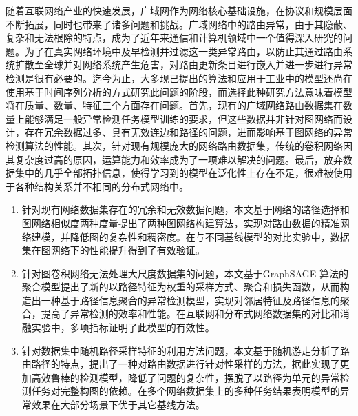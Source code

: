 
\begin{chineseabstract}
    随着互联网络产业的快速发展，广域网作为网络核心基础设施，在协议和规模层面不断拓展，同时也带来了诸多问题和挑战。广域网络中的路由异常，由于其隐蔽、复杂和无法根除的特点，成为了近年来通信和计算机领域中一个值得深入研究的问题。为了在真实网络环境中及早检测并过滤这一类异常路由，以防止其通过路由系统扩散至全球并对网络系统产生危害，对路由更新条目进行嵌入并进一步进行异常检测是很有必要的。迄今为止，大多现已提出的算法和应用于工业中的模型还尚在使用基于时间序列分析的方式研究此问题的阶段，而选择此种研究方法意味着模型将在质量、数量、特征三个方面存在问题。首先，现有的广域网络路由数据集在数量上能够满足一般异常检测任务模型训练的要求，但这些数据并非针对图网络而设计，存在冗余数据过多、具有无效连边和路径的问题，进而影响基于图网络的异常检测算法的性能。其次，针对现有规模庞大的网络路由数据集，传统的卷积网络因其复杂度过高的原因，运算能力和效率成为了一项难以解决的问题。最后，放弃数据集中的几乎全部拓扑信息，使得学习到的模型在泛化性上存在不足，很难被使用于各种结构关系并不相同的分布式网络中。

    \begin{enumerate}
        \item 针对现有网络数据集存在的冗余和无效数据问题，本文基于网络的路径选择和图网络相似度两种度量提出了两种图网络构建算法，实现对路由数据的精准网络建模，并降低图的复杂性和稠密度。在与不同基线模型的对比实验中，数据集在图网络下的性能提升得到了有效验证。
        \item 针对图卷积网络无法处理大尺度数据集的问题，本文基于GraphSAGE 算法的聚合模型提出了新的以路径特征为权重的采样方式、聚合和损失函数，从而构造出一种基于路径信息聚合的异常检测模型，实现对邻居特征及路径信息的聚合，提高了异常检测的效率和性能。在互联网和分布式网络数据集的对比和消融实验中，多项指标证明了此模型的有效性。
        \item 针对数据集中随机路径采样特征的利用方法问题，本文基于随机游走分析了路由路径的特点，提出了一种对路由数据进行针对性采样的方法，据此实现了更加高效鲁棒的检测模型，降低了问题的复杂性，摆脱了以路径为单元的异常检测任务对完整构图的依赖。在多个网络数据集上的多种任务结果表明模型的异常效果在大部分场景下优于其它基线方法。
    \end{enumerate}
\end{chineseabstract}

